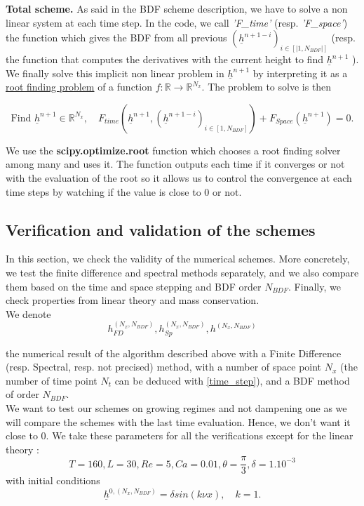 \documentclass[12pt]{article}
\begin{document}
\textbf{Total scheme.} As said in the BDF scheme description, we have to solve a non linear system at each time step. In the code, we call \textit{'F\_time'} (resp. \textit{'F\_space'}) the function which gives the BDF from all previous $(\underline{h}^{n+1-i})_{i\in [|1, N_{BDF}|]}$  (resp. the function that computes the derivatives with the current height to find $\underline{h}^{n+1}$ ).
We finally solve this implicit non linear problem in $\underline{h}^{n+1}$  by interpreting it as a \underline{root finding problem} of a function $f:\mathbb{R}\rightarrow \mathbb{R}^{N_x}$. The problem to solve is then 

\begin{equation}
    \boxed{
    \text{Find } \underline{h}^{n+1} \in \mathbb{R}^{N_x}, \quad F_{time}(\underline{h}^{n+1}, (\underline{h}^{n+1-i})_{i\in [1, N_{BDF}]})+F_{Space}(\underline{h}^{n+1})=0.
    }
\end{equation}

We use the \textbf{scipy.optimize.root} function which chooses a root finding solver among many and uses it. The function outputs each time if it converges or not with the evaluation of the root so it allows us to control the convergence at each time steps by watching if the value is close to 0 or not. 



\subsection{Verification and validation of the schemes}
In this section, we check the validity of the numerical schemes. More concretely, we test the finite difference and spectral methods separately, and we also compare them based on the time and space stepping and BDF order $N_{BDF}$. Finally, we check properties from linear theory and mass conservation.
\\

We denote 
\begin{equation}
    h_{FD}^{(N_x, N_{BDF})}, h_{Sp}^{(N_x, N_{BDF})}, h^{(N_x, N_{BDF})}    
\end{equation} 

the numerical result of the algorithm described above with a Finite Difference (resp. Spectral, resp. not precised) method, with a number of space point $N_x$ (the number of time point $N_t$ can be deduced with \eqref{time_step}), and a BDF method of order $N_{BDF}$.
\\

We want to test our schemes on growing regimes and not dampening one as we will compare the schemes with the last time evaluation. Hence, we don't want it close to 0. We take these parameters for all the verifications except for the linear theory :
\begin{equation}\label{eq_value_variables_num_verif}
\boxed{
    T = 160, L=30, Re=5, Ca= 0.01, \theta = \frac{\pi}{3}, \delta = 1.10^{-3}
    }
\end{equation}
with initial conditions
\begin{equation}
    \underline{h}^{0, (N_x, N_{BDF})} = \delta sin(k\nu x), \quad k=1.
\end{equation}
\end{document}
